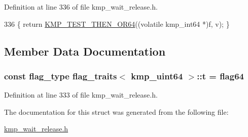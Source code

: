 Definition at line 336 of file kmp\-\_\-wait\-\_\-release.\-h.


\begin{DoxyCode}
336 \{ \textcolor{keywordflow}{return} \hyperlink{kmp__os_8h_af743c5b57e6265f8cc3ec213ddd08825}{KMP\_TEST\_THEN\_OR64}((\textcolor{keyword}{volatile} kmp\_int64 *)f, v); \}
\end{DoxyCode}


\subsection{Member Data Documentation}
\hypertarget{structflag__traits_3_01kmp__uint64_01_4_a0fdaf5c8a6127d85abd0b226f923feed}{
\subsubsection[{t}]{\setlength{\rightskip}{0pt plus 5cm}const {\bf flag\-\_\-type} {\bf flag\-\_\-traits}$<$ kmp\-\_\-uint64 $>$\-::t = {\bf flag64}\hspace{0.3cm}{\ttfamily [static]}}}\label{structflag__traits_3_01kmp__uint64_01_4_a0fdaf5c8a6127d85abd0b226f923feed}


Definition at line 333 of file kmp\-\_\-wait\-\_\-release.\-h.



The documentation for this struct was generated from the following file\-:\begin{DoxyCompactItemize}
\item 
\hyperlink{kmp__wait__release_8h}{kmp\-\_\-wait\-\_\-release.\-h}\end{DoxyCompactItemize}
